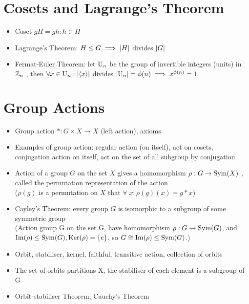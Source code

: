 \section{Cosets and Lagrange's Theorem}
\begin{itemize}
      \item Coset $gH = {gh: h \in H}$
      \item Lagrange's Theorem: $ H \leq G \implies \left| H \right| $ divides $ \left| G \right| $
      \item Fermat-Euler Theorem: let $\mathrm{U}_n$ be the group of invertible integers (units) in $\mathbb{Z}_n$ , then $\forall x \in \mathrm{U}_n: \left| \langle x \rangle \right| $ divides $\left| \mathrm{U}_n \right| = \phi(n) \implies x^{\phi(n)} = 1 $
\end{itemize}


\section{Group Actions}
\begin{itemize}
      \item Group action $*:G\times X\to X$ (left action), axioms
      \item Examples of group action: regular action (on itself), act on cosets, conjugation action on itself, act on the set of all subgroup by conjugation
      \item Action of a group $G$ on the set $X$ gives a homomorphism $\rho:G\to\operatorname{Sym}(X)$ , called the permutation representation of the action\\
            ($\rho(g)$ is a permutation on $X$ that $\forall \; x: \rho(g)(x) = g*x$)
      \item Cayley's Theorem: every group $G$ is isomorphic to a subgroup of
            some symmetric group \\
            (Action group G on the set G, have homomorphism $\rho:G\to \operatorname{Sym}(G)$,
            and $\operatorname{Im} (\rho)\leq \operatorname{Sym}(G),\operatorname{Ker}(\rho)=\{e\}$, so
            $G\cong \operatorname{Im}(\rho)\leq \operatorname{Sym}(G)$.)
      \item Orbit, stabiliser, kernel, faithful, transitive action, collection of orbits
      \item The set of orbits partitions X, the stabiliser of each element is
            a subgroup of G
      \item Orbit-stabiliser Theorem, Cauchy's Theorem
\end{itemize}

